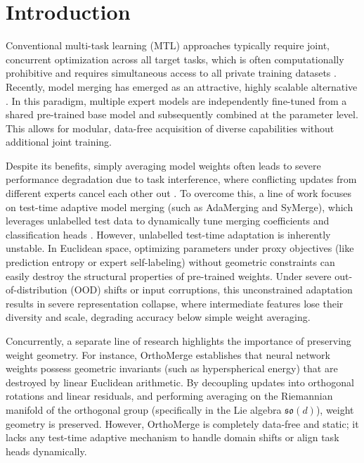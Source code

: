 \documentclass{article}
\theoremstyle{plain}
\theoremstyle{definition}
\theoremstyle{remark}
\begin{document}
\section{Introduction}
\label{submission-introduction}

Conventional multi-task learning (MTL) approaches typically require joint, concurrent optimization across all target tasks, which is often computationally prohibitive and requires simultaneous access to all private training datasets \cite{caruana1997multitask}. Recently, model merging has emerged as an attractive, highly scalable alternative \cite{wortsman2022model, ilharco2023editing, yadav2024ties}. In this paradigm, multiple expert models are independently fine-tuned from a shared pre-trained base model and subsequently combined at the parameter level. This allows for modular, data-free acquisition of diverse capabilities without additional joint training.

Despite its benefits, simply averaging model weights often leads to severe performance degradation due to task interference, where conflicting updates from different experts cancel each other out \cite{yadav2024ties, du2024parameter}. To overcome this, a line of work focuses on test-time adaptive model merging (such as AdaMerging and SyMerge), which leverages unlabelled test data to dynamically tune merging coefficients and classification heads \cite{yang2024adamerging, symerge2025symerge}. However, unlabelled test-time adaptation is inherently unstable. In Euclidean space, optimizing parameters under proxy objectives (like prediction entropy or expert self-labeling) without geometric constraints can easily destroy the structural properties of pre-trained weights. Under severe out-of-distribution (OOD) shifts or input corruptions, this unconstrained adaptation results in severe representation collapse, where intermediate features lose their diversity and scale, degrading accuracy below simple weight averaging.

Concurrently, a separate line of research highlights the importance of preserving weight geometry. For instance, OrthoMerge \cite{orthomerge2026orthogonal} establishes that neural network weights possess geometric invariants (such as hyperspherical energy) that are destroyed by linear Euclidean arithmetic. By decoupling updates into orthogonal rotations and linear residuals, and performing averaging on the Riemannian manifold of the orthogonal group (specifically in the Lie algebra $\mathfrak{so}(d)$), weight geometry is preserved. However, OrthoMerge is completely data-free and static; it lacks any test-time adaptive mechanism to handle domain shifts or align task heads dynamically.
\end{document}
